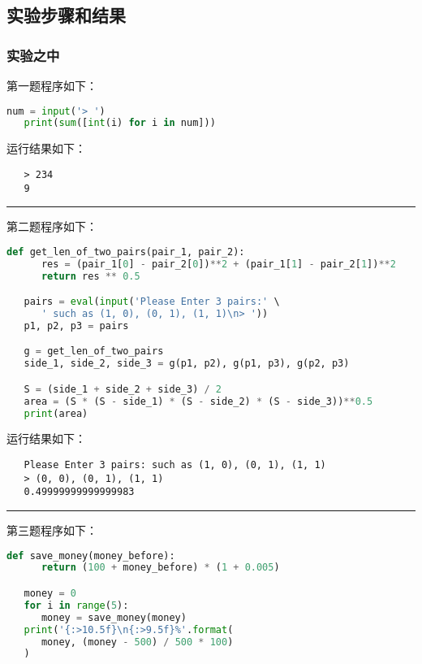 \documentclass[a4paper]{ctexart}
\newcommand{\lineiin}{
   \begin{center}
      \rule{\textwidth}{0.1pt}
   \end{center}
}
\begin{document}
   \subsection{实验步骤和结果}
      \subsubsection{实验之中}
      第一题程序如下：
      \begin{lstlisting}[language=python]
   num = input('> ')
   print(sum([int(i) for i in num]))
      \end{lstlisting}

      运行结果如下：
      \begin{lstlisting}
   > 234
   9
      \end{lstlisting}

      \lineiin

      第二题程序如下：
      \begin{lstlisting}[language=python]
   def get_len_of_two_pairs(pair_1, pair_2):
      res = (pair_1[0] - pair_2[0])**2 + (pair_1[1] - pair_2[1])**2
      return res ** 0.5

   pairs = eval(input('Please Enter 3 pairs:' \
      ' such as (1, 0), (0, 1), (1, 1)\n> '))
   p1, p2, p3 = pairs

   g = get_len_of_two_pairs
   side_1, side_2, side_3 = g(p1, p2), g(p1, p3), g(p2, p3)

   S = (side_1 + side_2 + side_3) / 2
   area = (S * (S - side_1) * (S - side_2) * (S - side_3))**0.5
   print(area)
      \end{lstlisting}

      运行结果如下：
      \begin{lstlisting}
   Please Enter 3 pairs: such as (1, 0), (0, 1), (1, 1)
   > (0, 0), (0, 1), (1, 1)
   0.49999999999999983
      \end{lstlisting}

      \lineiin

      第三题程序如下：
      \begin{lstlisting}[language=python]
   def save_money(money_before):
      return (100 + money_before) * (1 + 0.005)

   money = 0
   for i in range(5):
      money = save_money(money)
   print('{:>10.5f}\n{:>9.5f}%'.format(
      money, (money - 500) / 500 * 100)
   )
      \end{lstlisting}
\end{document}
